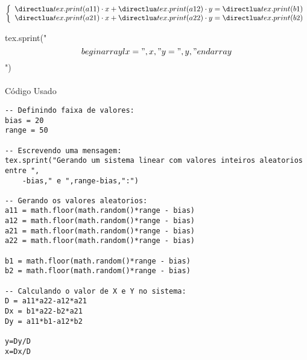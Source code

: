 \documentclass{article}
\begin{document}
\begin{equation}
\left\{
\begin{array}{l}
\printLua{a11}\cdot x + \printLua{a12} \cdot y = \printLua{b1}\\
\printLua{a21}\cdot x + \printLua{a22} \cdot y = \printLua{b2}\\
\end{array}
\right.
\end{equation}

\begin{luacode}
tex.sprint("$$\\begin{array}{l}x = ",x,"\\\\y = ",y,"\\end{array}$$")
\end{luacode}

\paragraph{}Código Usado

\begin{verbatim}
-- Definindo faixa de valores:
bias = 20
range = 50 

-- Escrevendo uma mensagem:
tex.sprint("Gerando um sistema linear com valores inteiros aleatorios entre ",
    -bias," e ",range-bias,":")

-- Gerando os valores aleatorios:
a11 = math.floor(math.random()*range - bias)
a12 = math.floor(math.random()*range - bias)
a21 = math.floor(math.random()*range - bias)
a22 = math.floor(math.random()*range - bias)

b1 = math.floor(math.random()*range - bias)
b2 = math.floor(math.random()*range - bias)

-- Calculando o valor de X e Y no sistema:
D = a11*a22-a12*a21
Dx = b1*a22-b2*a21
Dy = a11*b1-a12*b2

y=Dy/D
x=Dx/D
\end{verbatim}
\end{document}

